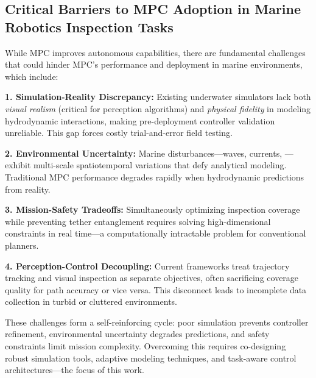 \subsection{Critical Barriers to \ac{MPC} Adoption in Marine Robotics Inspection Tasks}
\label{subsec:mpc_barriers}

While \ac{MPC} improves autonomous capabilities, there are fundamental challenges that could hinder \ac{MPC}'s performance and deployment in marine environments, which include:

\textbf{1. Simulation-Reality Discrepancy:} Existing underwater simulators lack both \textit{visual realism} (critical for perception algorithms) and \textit{physical fidelity} in modeling hydrodynamic interactions, making pre-deployment controller validation unreliable. This gap forces costly trial-and-error field testing.

\textbf{2. Environmental Uncertainty:} Marine disturbances—waves, currents, —exhibit multi-scale spatiotemporal variations that defy analytical modeling. Traditional \ac{MPC} performance degrades rapidly when hydrodynamic predictions from reality.

\textbf{3. Mission-Safety Tradeoffs:} Simultaneously optimizing inspection coverage while preventing tether entanglement requires solving high-dimensional constraints in real time—a computationally intractable problem for conventional planners.

\textbf{4. Perception-Control Decoupling:} Current frameworks treat trajectory tracking and visual inspection as separate objectives, often sacrificing coverage quality for path accuracy or vice versa. This disconnect leads to incomplete data collection in turbid or cluttered environments.

These challenges form a self-reinforcing cycle: poor simulation prevents controller refinement, environmental uncertainty degrades predictions, and safety constraints limit mission complexity. Overcoming this requires co-designing robust simulation tools, adaptive modeling techniques, and task-aware control architectures—the focus of this work.